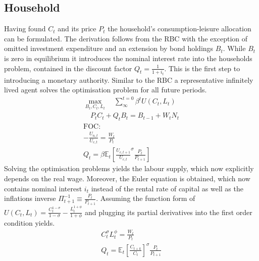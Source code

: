 \documentclass[12pt,a4paper,english]{article} %
\newcommand{\E}{\mathbb{E}} %
\begin{document}
	\subsection{Household} \label{nk_household}
	Having found $C_t$ and its price $P_t$ the household's consumption-leisure allocation can be formulated. The derivation follows from the RBC with the exception of omitted investment expenditure and an extension by bond holdings $B_t$. While $B_t$ is zero in equilibrium it introduces the nominal interest rate into the households problem, contained in the discount factor $Q_t = \frac{1}{1+i_t}$. This is the first step to introducing a monetary authority. Similar to the RBC a representative infinitely lived agent solves the optimisation problem for all future periods. 
	\begin{equation}
		\begin{aligned}
			\max_{B_t, C_t, L_t} \quad \sum_{\infty}^{t=0} \beta^{t} U(C_{t}, L_{t}) \\
			\quad P_t C_t + Q_t B_t = B_{t-1} + W_t N_t \\
			\textrm{FOC:} \\
				- \frac{U_{n,t}}{U_{c, t}} = \frac{W_t}{P_t}\\
				Q_t = \beta \E_t \left[ \frac{U_{c, t+1}}{U_{c,t}}^\sigma \frac{P_t}{P_{t+1}} \right] 			
		\end{aligned}
	\end{equation}
	Solving the optimisation problems yields the labour supply, which now explicitly depends on the real wage. Moreover, the Euler equation is obtained, which now contains nominal interest $i_t$ instead of the rental rate of capital as well as the inflations inverse $\Pi_{t+1}^{-1} \equiv \frac{P_t}{P_{t+1}}$. Assuming the function form of $U(C_t, L_t) = \frac{C_t^{1-\sigma}}{{1-\sigma}} - \frac{L_t^{1+\phi}}{1+\phi}$ and plugging its partial derivatives into the first order condition yields.
		\begin{equation} \label{eq:nk_hh_foc}
		\begin{aligned}
			C_t^\sigma L_t^\phi	= \frac{W_t}{P_t} \\
			Q_{t} = \E_t \left[ \frac{C_{t+k}}{C_t} \right]^\sigma \frac{P_t}{P_{t+1}}
		\end{aligned}
	\end{equation}
	
\end{document}
